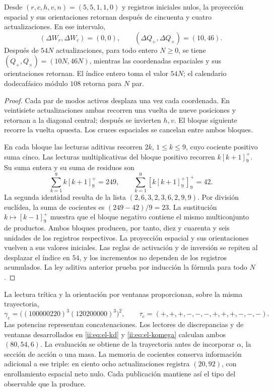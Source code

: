 \begin{proposition}
\label{ii:ii:electron-memoria-retorno}
Desde \((r,c,h,v,n)=(5,5,1,1,0)\) y registros iniciales nulos, la
proyección espacial y sus orientaciones retornan después de cincuenta y cuatro
actualizaciones. En ese intervalo,
\[
 (\Delta W_r,\Delta W_c)=(0,0),\qquad
 (\Delta Q_+,\Delta Q_\times)=(10,46).
\]
Después de \(54N\) actualizaciones, para todo entero \(N\geq0\),
se tiene \((Q_+,Q_\times)=(10N,46N)\), mientras las coordenadas
espaciales y sus orientaciones retornan. El índice entero toma el valor
\(54N\); el calendario dodecafásico módulo \(108\) retorna para
\(N\) par.
\end{proposition}
\begin{proof}
Cada par de modos activos desplaza una vez cada coordenada. En
veintisiete actualizaciones ambas recorren una vuelta de nueve
posiciones y retornan a la diagonal central; después se invierten
\(h,v\). El bloque siguiente recorre la vuelta opuesta. Los cruces
espaciales se cancelan entre ambos bloques.

En cada bloque las lecturas aditivas recorren \(2k\),
\(1\leq k\leq9\), cuyo cociente positivo suma cinco. Las lecturas
multiplicativas del bloque positivo recorren
\(k[k+1]^+_9\). Su suma entera y su suma de residuos son
\[
 \sum_{k=1}^9 k[k+1]^+_9=249,\qquad
 \sum_{k=1}^9[k[k+1]^+_9]^+_9=42.
\]
La segunda identidad resulta de la lista
\((2,6,3,2,3,6,2,9,9)\). Por división euclídea,
la suma de cocientes es \((249-42)/9=23\). La sustitución
\(k\mapsto[k-1]^+_9\) muestra que el bloque negativo contiene
el mismo multiconjunto de productos. Ambos bloques producen, por
tanto, diez y cuarenta y seis unidades de los registros respectivos.
La proyección espacial y sus orientaciones vuelven a sus valores
iniciales. Las reglas de activación y de inversión se repiten al
desplazar el índice en \(54\), y los incrementos no dependen de los
registros acumulados. La ley aditiva
anterior prueba por inducción la fórmula para todo \(N\).
\end{proof}

La lectura trítica y la orientación por ventanas proporcionan, sobre
la misma trayectoria,
\[
 \gamma_e=\bigl((100000220)^3(120200000)^3\bigr)^2,\qquad
 \tau_e=(+,+,+,-,-,-,+,+,+,-,-,-).
\]
Las potencias representan concatenaciones. Los lectores de
discrepancias y de ventanas desarrollados en
\eqref{ii:eq:el-kd} y \eqref{ii:eq:el-komega} calculan ambos
\((80,54,6)\). La evaluación se obtiene de la trayectoria antes
de incorporar \(\alpha\), la sección de acción o una masa.
La memoria de cocientes conserva información adicional a ese triple:
en ciento ocho actualizaciones registra \((20,92)\), con
enrollamiento espacial neto nulo. Cada publicación mantiene así el
tipo del observable que la produce.

